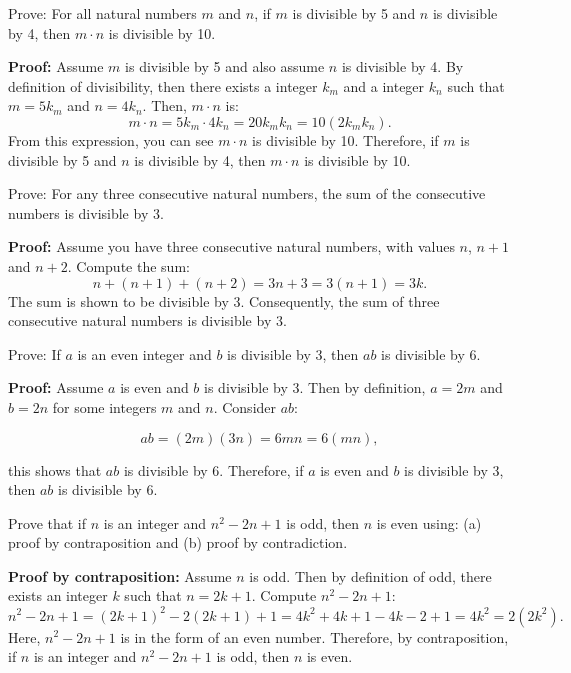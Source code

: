 \begin{questions}
 Prove: For all natural numbers $m$ and $n$, if $m$ is divisible by 5 and $n$ is divisible by 4, then $m\cdot n$ is divisible by 10.
    \ifprintanswers
        \vspace{-10pt}
    \fi
  \begin{solution} \textbf{Proof:} Assume $m$ is divisible by 5 and also assume $n$ is divisible by 4.  By definition of divisibility, then there exists a integer $k_m$ and a integer $k_n$ such that $m = 5k_m$ and $n=4k_n$.  Then, $m\cdot n$ is:
    \[ m\cdot n = 5k_m \cdot 4k_n = 20k_mk_n = 10(2k_mk_n). \]
  From this expression, you can see $m\cdot n$ is divisible by 10.  Therefore, if $m$ is divisible by 5 and $n$ is divisible by 4, then $m \cdot n$ is divisible by 10.
  \end{solution}



 Prove: For any three consecutive natural numbers, the sum of the consecutive numbers is divisible by 3.
    \ifprintanswers
        \vspace{-10pt}
    \fi
  \begin{solution} \textbf{Proof:} Assume you have three consecutive natural numbers, with values $n$, $n+1$ and $n+2$.  Compute the sum:
    \[ n + (n+1) + (n+2) = 3n+3 = 3(n+1) = 3k. \]
  The sum is shown to be divisible by 3.  Consequently, the sum of three consecutive natural numbers is divisible by 3.
  \end{solution}




 Prove: If $a$ is an even integer and $b$ is divisible by 3, then $ab$ is divisible by 6. 
    \ifprintanswers
        \vspace{-10pt}
    \fi
\begin{solution}
\textbf{Proof:}  Assume $a$ is even and $b$ is divisible by 3.  Then by definition, $a = 2m$ and $b=2n$ for some integers $m$ and $n$.  Consider $ab$: 

\[ ab = (2m)(3n) = 6mn = 6(mn), \]

this shows that $ab$ is divisible by 6.  Therefore, if $a$ is even and $b$ is divisible by 3, then $ab$ is divisible by 6.
\end{solution}




  Prove that if $n$ is an integer and $n^2 - 2n + 1$ is odd,
then $n$ is even using: (a) proof by contraposition and (b) proof by
contradiction.
    \ifprintanswers
        \vspace{-10pt}
    \fi
\begin{solution} \textbf{Proof by contraposition:}
    Assume $n$ is odd.  Then by definition of odd, there exists an
    integer $k$ such that $n=2k+1$.  Compute $n^2 - 2n + 1$:
    \[ n^2 - 2n + 1 = (2k+1)^2 - 2(2k+1) + 1 = 4k^2 + 4k + 1 - 4k - 2 + 1 = 4k^2 = 2(2k^2). \]
    Here, $n^2 - 2n + 1$ is in the form of an even number.  Therefore, by
    contraposition, if $n$ is an integer and $n^2 - 2n + 1$ is odd,
    then $n$ is even.


\end{solution}
\end{questions}

